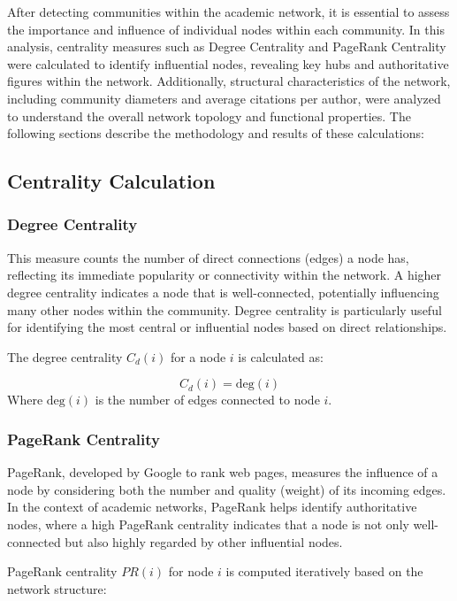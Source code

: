 \documentclass[11pt]{article}
\begin{document}
After detecting communities within the academic network, it is essential to assess the importance and influence of individual nodes within each community. In this analysis, centrality measures such as Degree Centrality and PageRank Centrality were calculated to identify influential nodes, revealing key hubs and authoritative figures within the network. Additionally, structural characteristics of the network, including community diameters and average citations per author, were analyzed to understand the overall network topology and functional properties. The following sections describe the methodology and results of these calculations:

\subsection{Centrality Calculation}

\subsubsection{Degree Centrality}

This measure counts the number of direct connections (edges) a node has, reflecting its immediate popularity or connectivity within the network. A higher degree centrality indicates a node that is well-connected, potentially influencing many other nodes within the community. Degree centrality is particularly useful for identifying the most central or influential nodes based on direct relationships.

 The degree centrality \( C_d(i) \) for a node \( i \) is calculated as:
  
  \[
  C_d(i) = \text{deg}(i)
  \]
  Where \( \text{deg}(i) \) is the number of edges connected to node \( i \).

\subsubsection{PageRank Centrality}

PageRank, developed by Google to rank web pages, measures the influence of a node by considering both the number and quality (weight) of its incoming edges. In the context of academic networks, PageRank helps identify authoritative nodes, where a high PageRank centrality indicates that a node is not only well-connected but also highly regarded by other influential nodes.

PageRank centrality \( PR(i) \) for node \( i \) is computed iteratively based on the network structure:
  
\end{document}
